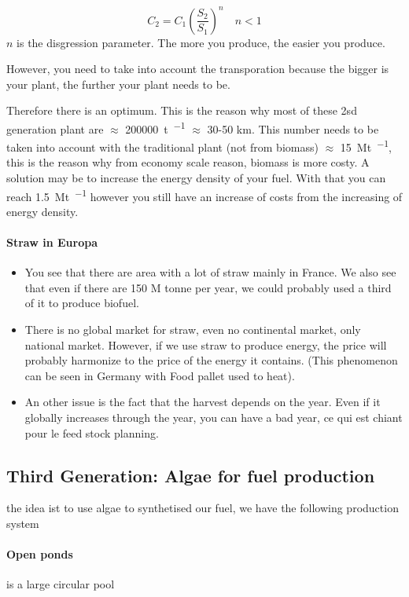 \documentclass[10pt,a4paper]{article}
\begin{document}
\[ C_2 = C_1 \left(\frac{S_2}{S_1} \right)^n \quad n < 1 \]
$n$ is the disgression parameter. The more you produce, the easier you produce.

However, you need to take into account the transporation because the bigger is your plant, the further your plant needs to be.

 Therefore there is an optimum. This is the reason why most of these 2sd generation plant are $\approx$ \SI{200000}{\tonne \per \year} $\approx$ 30-50 \si{\kilo \meter}. This number needs to be taken into account with the traditional plant (not from biomass) $\approx  $  \SI{15}{\mega\tonne \per \year}, this is the reason why from economy scale reason, biomass is more costy. A solution may be to increase the energy density of your fuel. With that you can reach \SI{1,5}{\mega\tonne \per \year} however you still have an increase of costs from the increasing of energy density.
 
 
 \paragraph{Straw in Europa}
 \begin{itemize}
 \item You see that there are area with a lot of straw mainly in France. We also see that even if there are 150 M tonne per year, we could probably used a third of it to produce biofuel.
 \item There is no global market for straw, even no continental market, only national market. However, if we use straw to produce energy, the price will probably harmonize to the price of the energy it contains. (This phenomenon can be seen in Germany with Food pallet used to heat).
 \item An other issue is the fact that the harvest depends on the year. Even if it globally increases through the year, you can have a bad year, ce qui est chiant pour le feed stock planning.
 \end{itemize}
 
 \subsection{Third Generation: Algae for fuel production} the idea ist to use algae to synthetised our fuel, we have the following production system
 \paragraph{Open ponds}is a large circular pool
\end{document}

